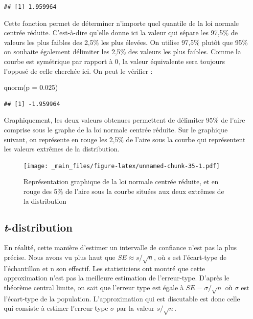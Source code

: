 \documentclass[
  french,
]{book}
\newenvironment{Shaded}{\begin{snugshade}}{\end{snugshade}}
\newcommand{\AttributeTok}[1]{\textcolor[rgb]{0.77,0.63,0.00}{#1}}
\newcommand{\FloatTok}[1]{\textcolor[rgb]{0.00,0.00,0.81}{#1}}
\newcommand{\FunctionTok}[1]{\textcolor[rgb]{0.00,0.00,0.00}{#1}}
\newcommand{\NormalTok}[1]{#1}
\begin{document}
\begin{verbatim}
## [1] 1.959964
\end{verbatim}

Cette fonction permet de déterminer n'importe quel quantile de la loi normale centrée réduite. C'est-à-dire qu'elle donne ici la valeur qui sépare les 97,5\% de valeurs les plus faibles des 2,5\% les plus élevées. On utilise 97,5\% plutôt que 95\% on souhaite également délimiter les 2,5\% des valeurs les plus faibles. Comme la courbe est symétrique par rapport à 0, la valeur équivalente sera toujours l'opposé de celle cherchée ici. On peut le vérifier :

\begin{Shaded}
\begin{Highlighting}[]
\FunctionTok{qnorm}\NormalTok{(}\AttributeTok{p =} \FloatTok{0.025}\NormalTok{)}
\end{Highlighting}
\end{Shaded}

\begin{verbatim}
## [1] -1.959964
\end{verbatim}

Graphiquement, les deux valeurs obtenues permettent de délimiter 95\% de l'aire comprise sous le graphe de la loi normale centrée réduite. Sur le graphique suivant, on représente en rouge les 2,5\% de l'aire sous la courbe qui représentent les valeurs extrêmes de la distribution.

\begin{figure}
\centering
\texttt{[image: \_main\_files/figure-latex/unnamed-chunk-35-1.pdf]}
\caption{\label{fig:unnamed-chunk-35}Représentation graphique de la loi normale centrée réduite, et en rouge des 5\% de l'aire sous la courbe situées aux deux extrêmes de la distribution}
\end{figure}

\hypertarget{t-distribution}{%
\subsection{\texorpdfstring{\emph{t}-distribution}{t-distribution}}\label{t-distribution}}

En réalité, cette manière d'estimer un intervalle de confiance n'est pas la plus précise. Nous avons vu plus haut que \(SE \approx s/\sqrt{n}\), où s est l'écart-type de l'échantillon et n son effectif. Les statisticiens ont montré que cette approximation n'est pas la meilleure estimation de l'erreur-type. D'après le théorème central limite, on sait que l'erreur type est égale à \(SE = \sigma/\sqrt{n}\) où \(\sigma\) est l'écart-type de la population. L'approximation qui est discutable est donc celle qui consiste à estimer l'erreur type \(\sigma\) par la valeur \(s/\sqrt{n}\).
\end{document}
